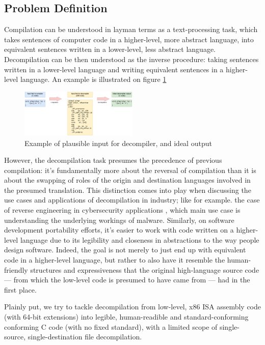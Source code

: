 \documentclass[../main.tex]{subfiles}
\begin{document}
\subsection{Problem Definition}

Compilation can be understood in layman terms as a text-processing task, which 
takes sentences of computer code in a higher-level, more abstract language, into
equivalent sentences written in a lower-level, less abstract language. Decompilation
can be then understood as the inverse procedure: taking sentences written in a
lower-level language and writing equivalent sentences in a higher-level language.
An example is illustrated on figure \ref{fig:decompilation_example} 

\begin{figure}[htbp]
\centering
\includegraphics[width=0.5\textwidth]{images/decompilation_example.png}
\caption{Example of plausible input for decompiler, and ideal output}
\label{fig:decompilation_example}
\end{figure}

However, the decompilation task presumes the precedence of previous compilation: 
it's fundamentally more about the reversal of compilation than it is about
the swapping of roles of the origin and destination languages involved in the
presumed translation. This distinction comes into play when discussing the use
cases and applications of decompilation in industry; like for example. the case
of reverse engineering in cybersecurity applications \cite{lin_reverse_2010} \cite{durfina_design_2011}, which
main use case is understanding the underlying workings of malware. Similarly, on
software development portability efforts, it's easier to work with code written
on a higher-level language due to its legibility and closeness in abstractions to
the way people design software. 
Indeed, the goal is not merely to just end up with equivalent code in a higher-level
language, but rather to also have it resemble the human-friendly structures and
expressiveness that the original high-language source code — from which the low-level
code is presumed to have came from — had in the first place.

Plainly put, we try to tackle decompilation from low-level, x86 ISA assembly code (with
64-bit extensions) into legible, human-readible and standard-conforming conforming C
code (with no fixed standard), with a limited scope of single-source, single-destination
file decompilation. 
\end{document}
